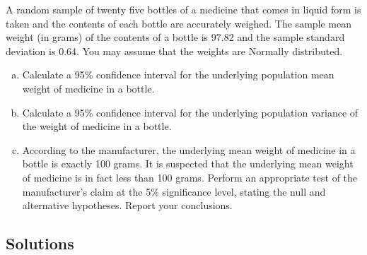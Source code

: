 \documentclass[a4paper,12pt]{article}
\begin{document}
\large 
\noindent 
A random sample of twenty five bottles of a medicine that comes in liquid form is taken
and the contents of each bottle are accurately weighed. The sample mean weight (in
grams) of the contents of a bottle is 97.82 and the sample standard deviation is 0.64. You
may assume that the weights are Normally distributed.

\begin{enumerate}[(a)]
    \item Calculate a 95\% confidence interval for the underlying population mean
weight of medicine in a bottle.
\item Calculate a 95\% confidence interval for the underlying population variance of the weight of medicine in a bottle.
\item According to the manufacturer, the underlying mean weight of medicine in a
bottle is exactly 100 grams. It is suspected that the underlying mean weight of
medicine is in fact less than 100 grams. Perform an appropriate test of the
manufacturer's claim at the 5\% significance level, stating the null and
alternative hypotheses. Report your conclusions. 
\end{enumerate}
\newpage 
\subsection*{Solutions}
\end{document}

